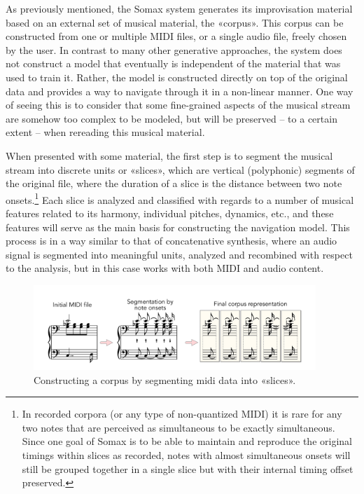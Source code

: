 As previously mentioned, the Somax system generates its improvisation material based on an external set of musical material, the «corpus». This corpus can be constructed from one or multiple MIDI files, or a single audio file, freely chosen by the user. In contrast to many other generative approaches, the system does not construct a model that eventually is independent of the material that was used to train it. Rather, the model is constructed directly on top of the original data and provides a way to navigate through it in a non-linear manner. One way of seeing this is to consider that some fine-grained aspects of the musical stream are somehow too complex to be modeled, but will be preserved – to a certain extent – when rereading this musical material.

When presented with some material, the first step is to segment the musical stream into discrete units or «slices», which are vertical (polyphonic) segments of the original file, where the duration of a slice is the distance between two note onsets.\footnote{In recorded corpora (or any type of non-quantized MIDI) it is rare for any two notes that are perceived as simultaneous to be exactly simultaneous. Since one goal of Somax is to be able to maintain and reproduce the original timings within slices as recorded, notes with almost simultaneous onsets will still be grouped together in a single slice but with their internal timing offset preserved.} Each slice is analyzed and classified with regards to a number of musical features related to its harmony, individual pitches, dynamics, etc., and these features will serve as the main basis for constructing the navigation model. This process is in a way similar to that of concatenative synthesis, where an audio signal is segmented into meaningful units, analyzed and recombined with respect to the analysis, but in this case works with both MIDI and audio content.

 \begin{figure}[h!]
    \centering        
 	\includegraphics[width=0.95\textwidth]{img/segmentation.png}
    \caption{Constructing a corpus by segmenting midi data into «slices».}
\end{figure}

